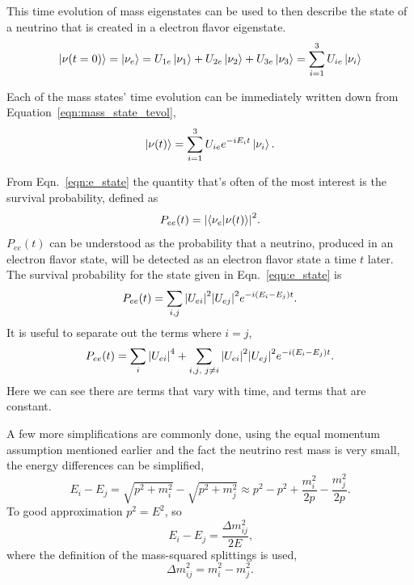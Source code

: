 This time evolution of mass eigenstates can be used to then describe the state
of a neutrino that is created in a electron flavor eigenstate.
\begin{equation}
\ket{\nu(t=0)} = \ket{\nu_{e}} = U_{1e}\ket{\nu_1} + U_{2e}\ket{\nu_{2}} + U_{3e}\ket{\nu_{3}}
    =\sum_{i=1}^{3}U_{ie}\ket{\nu_{i}}
\end{equation}

Each of the mass states' time evolution can be immediately written down from
Equation~\eqref{eqn:mass_state_tevol},
\begin{equation}
    \ket{\nu(t)} = \sum_{i=1}^{3} U_{ie}e^{-iE_{i}t}\ket{\nu_{i}}\text{.}
    \label{eqn:e_state}
\end{equation}

From Eqn.~\eqref{eqn:e_state} the quantity that's often of the most interest
is the survival probability, defined as
\begin{equation}
    P_{ee}(t) = \abs{\braket{\nu_{e}}{\nu(t)}}^{2}\text{.}
\end{equation}
$P_{ee}(t)$ can be understood as the probability that a neutrino, produced in
an electron flavor state, will be detected as an electron flavor state a time
$t$ later.
The survival probability for the state given in Eqn.~\eqref{eqn:e_state} is
\begin{equation}
    P_{ee}(t) = \sum_{i,j}\abs{U_{ei}}^2\abs{U_{ej}}^2e^{-i(E_{i} - E_{j})t}\text{.}
\end{equation}
It is useful to separate out the terms where $i=j$,
\begin{equation}
    P_{ee}(t) = \sum_{i}\abs{U_{ei}}^4 + \sum_{i,j\text{, }j \ne i}
    \abs{U_{ei}}^2\abs{U_{ej}}^2e^{-i(E_{i} - E_{j})t}\text{.}
\end{equation}
Here we can see there are terms that vary with time, and terms that are
constant.

A few more simplifications are commonly done, using the equal momentum
assumption mentioned earlier and the fact the neutrino rest mass is
very small, the energy differences can be simplified,
\begin{equation}
    E_{i} - E_{j} = \sqrt{p^{2} + m_{i}^{2}} - \sqrt{p^{2} + m_{j}^{2}} \approx
    p^{2} - p^{2} + \frac{m_{i}^2}{2p} - \frac{m_{j}^2}{2p}\text{.}
\end{equation}
To good approximation $p^2=E^2$, so
\begin{equation}
    E_{i} - E_{j} = \frac{\Delta m^{2}_{ij}}{2E}\text{,}
\end{equation}
where the definition of the mass-squared splittings is used,
\begin{equation}
    \Delta m^{2}_{ij} = m^{2}_{i} - m^{2}_{j}\text{.}
\end{equation}

